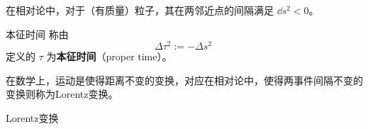 在相对论中，对于（有质量）粒子，其在两邻近点的间隔满足 $\dd s^2<0$。
\begin{definition}{本征时间}
称由
\begin{equation}
\Delta \tau^2:=-\Delta s^2~
\end{equation}
定义的 $\tau$ 为\textbf{本征时间}（proper time）。
\end{definition}

在数学上，运动是使得距离不变的变换，对应在相对论中，使得两事件间隔不变的变换则称为Lorentz变换。
\begin{definition}{Lorentz变换}

\end{definition}




















